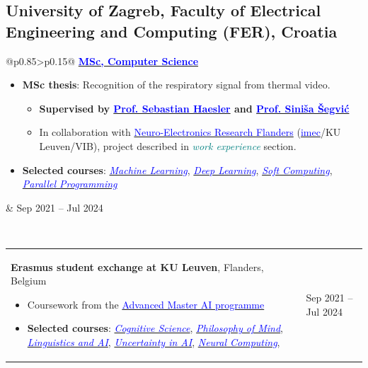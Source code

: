 \documentclass[a4paper]{article}
\makeatletter
\newlength{\tablewidth}
\newenvironment{period}[2]{%
\newcommand{\sarma}{#2}%
\setlength{\tablewidth}{\linewidth}
\addtolength{\tablewidth}{-2\tabcolsep}
\begin{tabular}{@{}p{0.85\tablewidth}>{\raggedleft\arraybackslash}p{0.15\tablewidth}@{}}%
#1 \newline
\begin{itemize}
}{%
\end{itemize} & \sarma \\%
\end{tabular}\\
}
\makeatother
\begin{document}
\subsection{\textbf{University of Zagreb, Faculty of Electrical Engineering and Computing (FER)}, Croatia}
\begin{period}{\textbf{\href{https://www.fer.unizg.hr/en/studies/cro/master/fer3/computing/cs#}{\textcolor{blue}{MSc, Computer Science}}}}{Sep 2021 -- Jul 2024}
    \item \textbf{MSc thesis}: Recognition of the respiratory signal from thermal video.
        \begin{itemize}
                \item[] \textbf{Supervised by \href{https://haeslerlab.sites.vib.be/en#/}{\textcolor{blue}{Prof. Sebastian Haesler}} and \href{https://www.zemris.fer.hr/~ssegvic/index_en.html}{\textcolor{blue}{Prof. Sini\v{s}a \v{S}egvi\'{c}}}}
              \item[] In collaboration with \href{https://nerf.be/en#/}{\textcolor{blue}{Neuro-Electronics Research Flanders}} (\href{https://www.imec-int.com/en}{\textcolor{blue}{imec}}/KU Leuven/VIB), project described in \textit{\textcolor{teal}{work experience}} section.
          \end{itemize}
    \item \textbf{Selected courses}:
        \textit{\href{https://www.fer.unizg.hr/en/course/maclea1}{\textcolor{blue}{Machine Learning}}},
        \textit{\href{https://www.fer.unizg.hr/en/course/deelea1_a}{\textcolor{blue}{Deep Learning}}},
        \textit{\href{https://www.fer.unizg.hr/en/course/sofcom}{\textcolor{blue}{Soft Computing}}},
        \textit{\href{https://www.fer.unizg.hr/en/course/parpro_b}{\textcolor{blue}{Parallel Programming}}}

\end{period}
\vspace{-0.1em}
\begin{period}{\hspace{12} \textbf{Erasmus student exchange at KU Leuven}, Flanders, Belgium}{Sep 2022 -- Jul 2023}
\item Coursework from the \href{https://www.kuleuven.be/programmes/master-artificial-intelligence}{\textcolor{blue}{Advanced Master AI programme}}
\item \textbf{Selected courses}:
        \textit{\href{https://onderwijsaanbod.kuleuven.be/syllabi/e/H02B2AE.htm#activetab=doelstellingen_idp1064224}{\textcolor{blue}{Cognitive Science}}},
        \textit{\href{https://onderwijsaanbod.kuleuven.be/syllabi/e/W0W26AE.htm#activetab=doelstellingen_idm10328960}{\textcolor{blue}{Philosophy of Mind}}},
        \textit{\href{https://onderwijsaanbod.kuleuven.be/2023/syllabi/e/H02B6AE.htm#activetab=doelstellingen_idp955552}{\textcolor{blue}{Linguistics and AI}}},
        \textit{\href{https://onderwijsaanbod.kuleuven.be/syllabi/e/H02D2AE.htm#activetab=doelstellingen_idm323056}{\textcolor{blue}{Uncertainty in AI}}},
        \textit{\href{https://onderwijsaanbod.kuleuven.be/2023/syllabi/e/H02B3AE.htm#activetab=doelstellingen_idp1044304}{\textcolor{blue}{Neural Computing}}},

\end{period}
\end{document}
